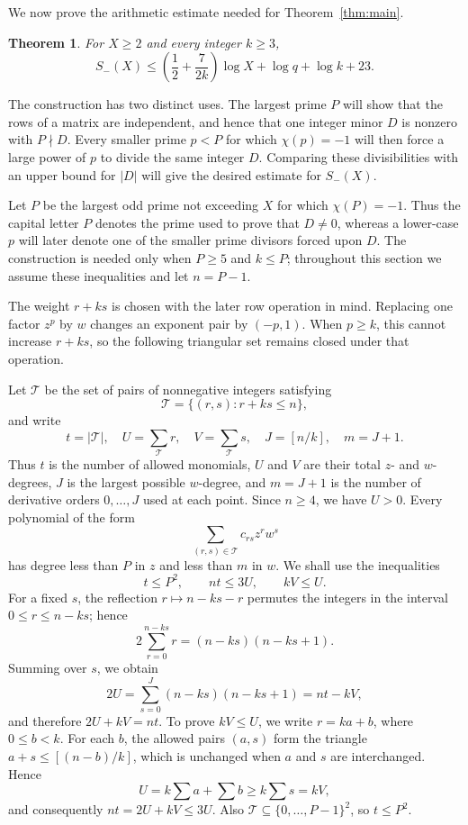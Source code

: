 \documentclass[11pt,twoside,leqno]{article}
\theoremstyle{apostol}
\newtheorem{theorem}{Theorem}
\newcommand{\fl}[1]{\left[#1\right]}
\begin{document}
We now prove the arithmetic estimate needed for
Theorem~\ref{thm:main}.

\begin{theorem}\label{thm:primeweight}
For \(X\ge2\) and every integer \(k\ge3\),
\begin{equation}\label{eq:primeweight}
 S_-(X)\le\left(\frac12+\frac7{2k}\right)\log X
               +\log q+\log k+23.
\end{equation}
\end{theorem}

The construction has two distinct uses. The largest prime \(P\) will show
that the rows of a matrix are independent, and hence that one integer minor
\(D\) is nonzero with \(P\nmid D\). Every smaller prime \(p<P\) for which
\(\chi(p)=-1\) will then force a large power of \(p\) to divide the same
integer \(D\). Comparing these divisibilities with an upper bound for
\(|D|\) will give the desired estimate for \(S_-(X)\).

Let \(P\) be the largest odd prime not exceeding \(X\) for which
\(\chi(P)=-1\). Thus the capital letter \(P\) denotes the prime used to
prove that \(D\ne0\), whereas a lower-case \(p\) will later denote one of
the smaller prime divisors forced upon \(D\). The construction is needed
only when \(P\ge5\) and \(k\le P\); throughout this section we assume these
inequalities and let \(n=P-1\).

The weight \(r+ks\) is chosen with the later row operation in mind.
Replacing one factor \(z^p\) by \(w\) changes an exponent pair by
\((-p,1)\). When \(p\ge k\), this cannot increase \(r+ks\), so the
following triangular set remains closed under that operation.

Let \(\mathcal T\) be the set of pairs of nonnegative integers satisfying
\[
 \mathcal T=\{(r,s):r+ks\le n\},
\]
and write
\[
 t=|\mathcal T|,\quad U=\sum_{\mathcal T}r,\quad
 V=\sum_{\mathcal T}s,\quad J=\fl{n/k},\quad m=J+1.
\]
Thus \(t\) is the number of allowed monomials, \(U\) and \(V\) are their
total \(z\)- and \(w\)-degrees, \(J\) is the largest possible \(w\)-degree,
and \(m=J+1\) is the number of derivative orders \(0,\ldots,J\) used at
each point.
Since \(n\ge4\), we have \(U>0\). Every polynomial of the form
\[
 \sum_{(r,s)\in\mathcal T}c_{rs}z^rw^s
\]
has degree less than \(P\) in \(z\) and less than \(m\) in \(w\). We shall
use the inequalities
\begin{equation}\label{eq:counts}
 t\le P^2,\qquad nt\le3U,\qquad kV\le U.
\end{equation}
For a fixed \(s\), the reflection \(r\mapsto n-ks-r\) permutes the
integers in the interval \(0\le r\le n-ks\); hence
\[
 2\sum_{r=0}^{n-ks}r=(n-ks)(n-ks+1).
\]
Summing over \(s\), we obtain
\[
 2U=\sum_{s=0}^J(n-ks)(n-ks+1)=nt-kV,
\]
and therefore \(2U+kV=nt\). To prove \(kV\le U\), we write \(r=ka+b\), where
\(0\le b<k\). For each \(b\), the allowed pairs \((a,s)\) form the
triangle \(a+s\le\fl{(n-b)/k}\), which is unchanged when \(a\) and \(s\)
are interchanged. Hence
\[
 U=k\sum a+\sum b\ge k\sum s=kV,
\]
and consequently \(nt=2U+kV\le3U\). Also
\(\mathcal T\subseteq\{0,\ldots,P-1\}^2\), so \(t\le P^2\).
\end{document}
